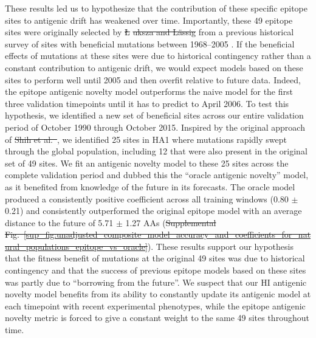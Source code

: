 \documentclass[9pt,lineno]{elife} %
\providecommand{\DIFadd}[1]{{\protect\color{blue}\uwave{#1}}} %
\providecommand{\DIFdel}[1]{{\protect\color{red}\sout{#1}}}                      %
\providecommand{\DIFaddbegin}{} %
\providecommand{\DIFaddend}{} %
\providecommand{\DIFdelbegin}{} %
\providecommand{\DIFdelend}{} %
\providecommand{\DIFaddtex}[1]{{\protect\color{blue}\uwave{#1}}} %
\providecommand{\DIFdeltex}[1]{{\protect\color{red}\sout{#1}}}                      %
\providecommand{\DIFaddbegin}{} %
\providecommand{\DIFaddend}{} %
\providecommand{\DIFdelbegin}{} %
\providecommand{\DIFdelend}{} %
\providecommand{\DIFadd}[1]{\texorpdfstring{\DIFaddtex{#1}}{#1}} %
\providecommand{\DIFdel}[1]{\texorpdfstring{\DIFdeltex{#1}}{}} %
\newcommand{\DIFscaledelfig}{0.5}
\newlength{\DIFdelgraphicswidth} %
\newlength{\DIFdelgraphicsheight} %
\newcommand{\DIFaddincludegraphics}[2][]{{\color{blue}\fbox{\DIFOincludegraphics[#1]{#2}}}} %
\newcommand{\DIFdelincludegraphics}[2][]{%
\sbox{\DIFdelgraphicsbox}{\DIFOincludegraphics[#1]{#2}}%
\settoboxwidth{\DIFdelgraphicswidth}{\DIFdelgraphicsbox} %
\settoboxtotalheight{\DIFdelgraphicsheight}{\DIFdelgraphicsbox} %
\scalebox{\DIFscaledelfig}{%
\parbox[b]{\DIFdelgraphicswidth}{\usebox{\DIFdelgraphicsbox}\\[-\baselineskip] \rule{\DIFdelgraphicswidth}{0em}}\llap{\resizebox{\DIFdelgraphicswidth}{\DIFdelgraphicsheight}{%
\setlength{\unitlength}{\DIFdelgraphicswidth}%
\begin{picture}(1,1)%
\thicklines\linethickness{2pt} %
{\color[rgb]{1,0,0}\put(0,0){\framebox(1,1){}}}%
{\color[rgb]{1,0,0}\put(0,0){\line( 1,1){1}}}%
{\color[rgb]{1,0,0}\put(0,1){\line(1,-1){1}}}%
\end{picture}%
}\hspace*{3pt}}} %
} %
\DeclareRobustCommand{\DIFaddbegin}{\DIFOaddbegin \let\includegraphics\DIFaddincludegraphics} %
\DeclareRobustCommand{\DIFaddend}{\DIFOaddend \let\includegraphics\DIFOincludegraphics} %
\DeclareRobustCommand{\DIFdelbegin}{\DIFOdelbegin \let\includegraphics\DIFdelincludegraphics} %
\DeclareRobustCommand{\DIFdelend}{\DIFOaddend \let\includegraphics\DIFOincludegraphics} %
\begin{document}
These results led us to hypothesize that the contribution of these specific epitope sites to antigenic drift has weakened over time.
Importantly, these 49 epitope sites were originally selected by \DIFdelbegin %
\DIFdel{\L}%
\DIFdel{uksza and L\"assig }\DIFdelend \cite{Luksza:2014hj} from a previous historical survey of sites with beneficial mutations between 1968--2005 \DIFdelbegin %
\DIFdelend \DIFaddbegin \citep{Shih:2007bd}\DIFaddend .
If the beneficial effects of mutations at these sites were due to historical contingency rather than a constant contribution to antigenic drift, we would expect models based on these sites to perform well until 2005 and then overfit relative to future data.
Indeed, the epitope antigenic novelty model outperforms the naive model for the first three validation timepoints until it has to predict to April 2006.
To test this hypothesis, we identified a new set of beneficial sites across our entire validation period of October 1990 through October 2015.
Inspired by the original approach of \DIFdelbegin \DIFdel{Shih et al.~}\DIFdelend \cite{Shih:2007bd}, we identified 25 sites in HA1 where mutations rapidly swept through the global population, including 12 that were also present in the original set of 49 sites.
We fit an antigenic novelty model to these 25 sites across the complete validation period and dubbed this the ``oracle antigenic novelty'' model, as it benefited from knowledge of the future in its forecasts.
The oracle model produced a consistently positive coefficient across all training windows (0.80 $\pm$ 0.21) and consistently outperformed the original epitope model with an average distance to the future of 5.71 $\pm$ 1.27 AAs (\DIFdelbegin \DIFdel{Supplemental Fig.~\ref{sup_fig:unadjusted_composite_model_accuracy_and_coefficients_for_natural_populations_epitope_vs_oracle}}\DIFdelend \DIFaddbegin \DIFadd{Figure~\ref{fig:unadjusted_model_accuracy_and_coefficients_for_natural_populations}-Figure supplement~\ref{figsupp:unadjusted_composite_model_accuracy_and_coefficients_for_natural_populations_epitope_vs_oracle}}\DIFaddend ).
These results support our hypothesis that the fitness benefit of mutations at the original 49 sites was due to historical contingency and that the success of previous epitope models based on these sites was partly due to ``borrowing from the future''.
We suspect that our HI antigenic novelty model benefits from its ability to constantly update its antigenic model at each timepoint with recent experimental phenotypes, while the epitope antigenic novelty metric is forced to give a constant weight to the same 49 sites throughout time.
\end{document}
